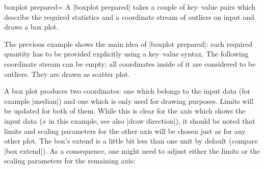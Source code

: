 \begin{plottype}[/pgfplots]{boxplot prepared=%
    \textcolor{black}{\normalfont{}}%
}
    A |boxplot prepared| takes a couple of key--value pairs which describe the
    required statistics and a coordinate stream of outliers on input and draws
    a box plot.
\begin{codeexample}[]
\end{codeexample}
    \noindent The previous example shows the main idea of |boxplot prepared|:
    each required quantity has to be provided explicitly using a key--value
    syntax. The following coordinate stream can be empty; all coordinates
    inside of it are considered to be outliers. They are drawn as scatter plot.

    A box plot produces two coordinates: one which belongs to the input data
    (for example |median|) and one which is only used for drawing purposes.
    Limits will be updated for both of them. While this is clear for the axis
    which shows the input data ($x$ in this example, see also
    |draw direction|), it should be noted that limits and scaling parameters
    for the other axis will be chosen just as for any other plot. The box's
    extend is a little bit less than one unit by default (compare
    |box extend|). As a consequence, one might need to adjust either the
    limits or the scaling parameters for the remaining axis:
\begin{codeexample}[]
\end{codeexample}
\end{plottype}

